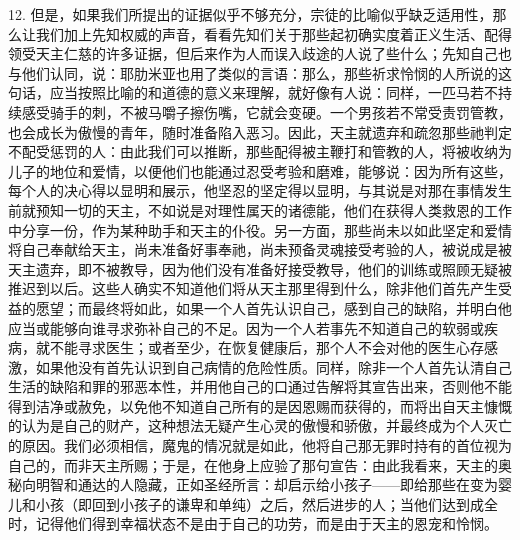 12. 但是，如果我们所提出的证据似乎不够充分，宗徒的比喻似乎缺乏适用性，那么让我们加上先知权威的声音，看看先知们关于那些起初确实度着正义生活、配得领受天主仁慈的许多证据，但后来作为人而误入歧途的人说了些什么；先知自己也与他们认同，说：耶肋米亚也用了类似的言语：那么，那些祈求怜悯的人所说的这句话，应当按照比喻的和道德的意义来理解，就好像有人说：同样，一匹马若不持续感受骑手的刺，不被马嚼子擦伤嘴，它就会变硬。一个男孩若不常受责罚管教，也会成长为傲慢的青年，随时准备陷入恶习。因此，天主就遗弃和疏忽那些祂判定不配受惩罚的人：由此我们可以推断，那些配得被主鞭打和管教的人，将被收纳为儿子的地位和爱情，以便他们也能通过忍受考验和磨难，能够说：因为所有这些，每个人的决心得以显明和展示，他坚忍的坚定得以显明，与其说是对那在事情发生前就预知一切的天主，不如说是对理性属天的诸德能，他们在获得人类救恩的工作中分享一份，作为某种助手和天主的仆役。另一方面，那些尚未以如此坚定和爱情将自己奉献给天主，尚未准备好事奉祂，尚未预备灵魂接受考验的人，被说成是被天主遗弃，即不被教导，因为他们没有准备好接受教导，他们的训练或照顾无疑被推迟到以后。这些人确实不知道他们将从天主那里得到什么，除非他们首先产生受益的愿望；而最终将如此，如果一个人首先认识自己，感到自己的缺陷，并明白他应当或能够向谁寻求弥补自己的不足。因为一个人若事先不知道自己的软弱或疾病，就不能寻求医生；或者至少，在恢复健康后，那个人不会对他的医生心存感激，如果他没有首先认识到自己病情的危险性质。同样，除非一个人首先认清自己生活的缺陷和罪的邪恶本性，并用他自己的口通过告解将其宣告出来，否则他不能得到洁净或赦免，以免他不知道自己所有的是因恩赐而获得的，而将出自天主慷慨的认为是自己的财产，这种想法无疑产生心灵的傲慢和骄傲，并最终成为个人灭亡的原因。我们必须相信，魔鬼的情况就是如此，他将自己那无罪时持有的首位视为自己的，而非天主所赐；于是，在他身上应验了那句宣告：由此我看来，天主的奥秘向明智和通达的人隐藏，正如圣经所言：却启示给小孩子——即给那些在变为婴儿和小孩（即回到小孩子的谦卑和单纯）之后，然后进步的人；当他们达到成全时，记得他们得到幸福状态不是由于自己的功劳，而是由于天主的恩宠和怜悯。\par

